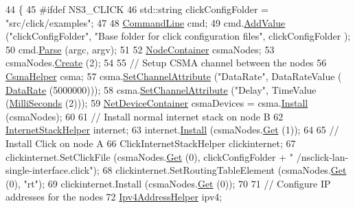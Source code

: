\begin{DoxyCode}
44 \{
45 \textcolor{preprocessor}{#ifdef NS3\_CLICK}
46   std::string clickConfigFolder = \textcolor{stringliteral}{"src/click/examples"};
47 
48   \hyperlink{classns3_1_1CommandLine}{CommandLine} cmd;
49   cmd.\hyperlink{classns3_1_1CommandLine_addcfb546c7ad4c8bd0965654d55beb8e}{AddValue} (\textcolor{stringliteral}{"clickConfigFolder"}, \textcolor{stringliteral}{"Base folder for click configuration files"}, clickConfigFolder
      );
50   cmd.\hyperlink{classns3_1_1CommandLine_a5c10b85b3207e5ecb48d907966923156}{Parse} (argc, argv);
51 
52   \hyperlink{classns3_1_1NodeContainer}{NodeContainer} csmaNodes;
53   csmaNodes.\hyperlink{classns3_1_1NodeContainer_a787f059e2813e8b951cc6914d11dfe69}{Create} (2);
54 
55   \textcolor{comment}{// Setup CSMA channel between the nodes}
56   \hyperlink{classns3_1_1CsmaHelper}{CsmaHelper} csma;
57   csma.\hyperlink{classns3_1_1CsmaHelper_a886d900b2fe44433e0b81752dea7e7f1}{SetChannelAttribute} (\textcolor{stringliteral}{"DataRate"}, DataRateValue (
      \hyperlink{classns3_1_1DataRate}{DataRate} (5000000)));
58   csma.\hyperlink{classns3_1_1CsmaHelper_a886d900b2fe44433e0b81752dea7e7f1}{SetChannelAttribute} (\textcolor{stringliteral}{"Delay"}, TimeValue (\hyperlink{group__timecivil_gaf26127cf4571146b83a92ee18679c7a9}{MilliSeconds} (2)));
59   \hyperlink{classns3_1_1NetDeviceContainer}{NetDeviceContainer} csmaDevices = csma.\hyperlink{classns3_1_1CsmaHelper_af79a91372595230b0817200270ab84e7}{Install} (csmaNodes);
60 
61   \textcolor{comment}{// Install normal internet stack on node B}
62   \hyperlink{classns3_1_1InternetStackHelper}{InternetStackHelper} internet;
63   internet.\hyperlink{classns3_1_1InternetStackHelper_a6645b412f31283d2d9bc3d8a95cebbc0}{Install} (csmaNodes.\hyperlink{classns3_1_1NodeContainer_a9ed96e2ecc22e0f5a3d4842eb9bf90bf}{Get} (1));
64 
65   \textcolor{comment}{// Install Click on node A}
66   ClickInternetStackHelper clickinternet;
67   clickinternet.SetClickFile (csmaNodes.\hyperlink{classns3_1_1NodeContainer_a9ed96e2ecc22e0f5a3d4842eb9bf90bf}{Get} (0), clickConfigFolder + \textcolor{stringliteral}{"
      /nsclick-lan-single-interface.click"});
68   clickinternet.SetRoutingTableElement (csmaNodes.\hyperlink{classns3_1_1NodeContainer_a9ed96e2ecc22e0f5a3d4842eb9bf90bf}{Get} (0), \textcolor{stringliteral}{"rt"});
69   clickinternet.Install (csmaNodes.\hyperlink{classns3_1_1NodeContainer_a9ed96e2ecc22e0f5a3d4842eb9bf90bf}{Get} (0));
70 
71   \textcolor{comment}{// Configure IP addresses for the nodes}
72   \hyperlink{classns3_1_1Ipv4AddressHelper}{Ipv4AddressHelper} ipv4;

\end{DoxyCode}

